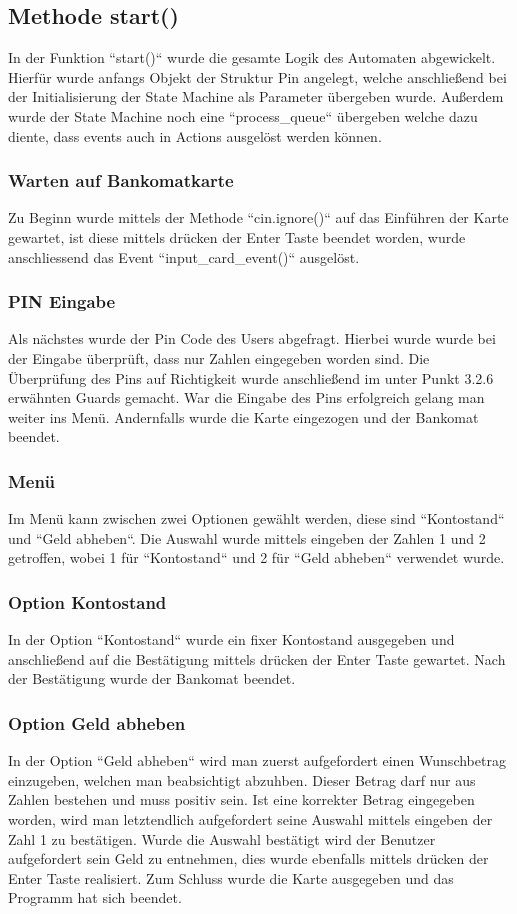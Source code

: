 \documentclass{report}
\begin{document}
\subsection{Methode start()}
In der Funktion ``start()`` wurde die gesamte Logik des Automaten abgewickelt. Hierfür wurde anfangs Objekt der Struktur Pin angelegt, welche anschließend bei der Initialisierung der State Machine als Parameter übergeben wurde. Außerdem wurde der State Machine noch eine ``process\_queue`` übergeben welche dazu diente, dass events auch in Actions ausgelöst werden können. 
\subsubsection{Warten auf Bankomatkarte}
Zu Beginn wurde mittels der Methode ``cin.ignore()`` auf das Einführen der Karte gewartet, ist diese mittels drücken der Enter Taste beendet worden, wurde anschliessend das Event ``input\_card\_event()`` ausgelöst. 
\subsubsection{PIN Eingabe}
Als nächstes wurde der Pin Code des Users abgefragt. Hierbei wurde wurde bei der Eingabe überprüft, dass nur Zahlen eingegeben worden sind. Die Überprüfung des Pins auf Richtigkeit wurde anschließend im unter Punkt 3.2.6 erwähnten Guards gemacht. War die Eingabe des Pins erfolgreich gelang man weiter ins Menü. Andernfalls wurde die Karte eingezogen und der Bankomat beendet.
\subsubsection{Menü}
Im Menü kann zwischen zwei Optionen gewählt werden, diese sind ``Kontostand`` und ``Geld abheben``. Die Auswahl wurde mittels eingeben der Zahlen 1 und 2 getroffen, wobei 1 für ``Kontostand`` und 2 für ``Geld abheben`` verwendet wurde. 

\subsubsection{Option Kontostand}
In der Option ``Kontostand`` wurde ein fixer Kontostand ausgegeben und anschließend auf die Bestätigung mittels drücken der Enter Taste gewartet. Nach der Bestätigung wurde der Bankomat beendet.

\subsubsection{Option Geld abheben}
In der Option ``Geld abheben`` wird man zuerst aufgefordert einen Wunschbetrag einzugeben, welchen man beabsichtigt abzuhben. Dieser Betrag darf nur aus Zahlen bestehen und muss positiv sein. Ist eine korrekter Betrag eingegeben worden, wird man letztendlich aufgefordert seine Auswahl mittels eingeben der Zahl 1 zu bestätigen. Wurde die Auswahl bestätigt wird der Benutzer aufgefordert sein Geld zu entnehmen, dies wurde ebenfalls mittels drücken der Enter Taste realisiert. Zum Schluss wurde die Karte ausgegeben und das Programm hat sich beendet.
\end{document}
